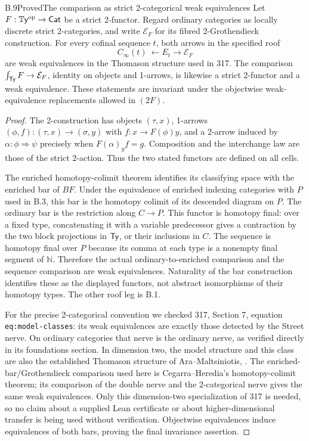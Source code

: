\begin{claim}{B.9}{Proved}{The comparison as strict 2-categorical weak equivalences}
\label{B:two-category}
Let $F:\mathbb{T}\mathsf{y}^{\mathrm{op}}\to\mathsf{Cat}$ be a strict 2-functor. Regard
ordinary categories as locally discrete strict 2-categories,
and write $\mathcal E_F$ for its fibred 2-Grothendieck construction.
For every cofinal sequence $t$, both arrows in the specified roof
\[
       C_\infty(t)\ \longleftarrow E_t
                         \longrightarrow\mathcal E_F
\]
are weak equivalences in the Thomason structure used in 317.
The comparison $\int_{\mathsf{Ty}}F\to\mathcal E_F$, identity on
objects and 1-arrows, is likewise a strict 2-functor and a weak
equivalence. These statements are invariant under the
objectwise weak-equivalence replacements allowed in $(2F)$.
\end{claim}
\begin{proof}
The 2-construction has objects $(\tau,x)$, 1-arrows
$(\phi,f):(\tau,x)\to(\sigma,y)$ with
$f:x\to F(\phi)y$, and a 2-arrow induced by
$\alpha:\phi\Rightarrow\psi$ precisely when
$F(\alpha)_y f=g$. Composition and the interchange law are
those of the strict 2-action. Thus the two stated functors
are defined on all cells.

The enriched homotopy-colimit theorem
\cite[Theorem 5.1 in the opened preprint]{BCegarraHeredia2015}
identifies its classifying
space with the enriched bar of $BF$. Under the equivalence of
enriched indexing categories with $P$ used in B.3, this bar is
the homotopy colimit of its descended diagram on $P$. The
ordinary bar is the restriction along $C\to P$. This functor
is homotopy final: over a fixed type, concatenating it with a
variable predecessor gives a contraction by the two block
projections in $\mathsf{Ty}$, or their inclusions in $C$. The sequence
is homotopy final over $P$ because its comma at each type is
a nonempty final segment of $\mathbb N$. Therefore the actual
ordinary-to-enriched comparison and the sequence comparison
are weak equivalences. Naturality of the bar construction
identifies these as the displayed functors, not abstract
isomorphisms of their homotopy types. The other roof leg is B.1.

For the precise 2-categorical convention we checked 317,
Section 7, equation \texttt{eq:model-classes}: its weak
equivalences are exactly those detected by the Street nerve.
On ordinary categories that nerve is the ordinary nerve, as
verified directly in its foundations section. In dimension two,
the model structure and this class are also the established
Thomason structure of Ara--Maltsiniotis,
\cite[Theorem 6.27]{BAraMaltsiniotis2014}.
The enriched-bar/Grothendieck comparison used here is
Cegarra--Heredia's homotopy-colimit theorem; its comparison of
the double nerve and the 2-categorical nerve gives the same
weak equivalences. Only this dimension-two specialization of
317 is needed, so no claim about a supplied Lean certificate
or about higher-dimensional transfer is being used without
verification. Objectwise equivalences induce equivalences
of both bars, proving the final invariance assertion.
\end{proof}

